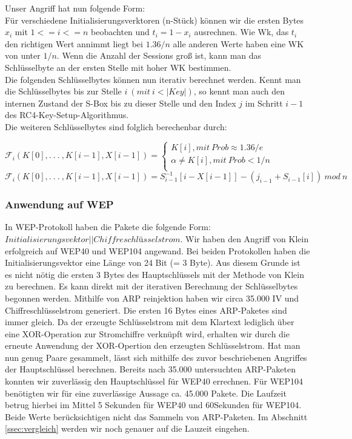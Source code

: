 \documentclass[10pt,a4paper]{article}
\begin{document}
Unser Angriff hat nun folgende Form:\\
Für verschiedene Initialisierungsverktoren (n-Stück) können wir die ersten Bytes $x_i$ mit $1 <= i <= n$ beobachten und $t_i = 1 - x_i$ ausrechnen. Wie Wk, das $t_i$ den richtigen Wert annimmt liegt bei $1.36/n$ alle anderen Werte haben eine WK von unter $1/n$. Wenn die Anzahl der Sessions groß ist, kann man das Schlüsselbyte an der ersten Stelle mit hoher WK bestimmen.\\
Die folgenden Schlüsselbytes können nun iterativ berechnet werden. Kennt man die Schlüsselbytes bis zur Stelle $i\ ( mit\  i < |Key|)$, so kennt man auch den internen Zustand der S-Box bis zu dieser Stelle und den Index $j$ im Schritt $i - 1$ des RC4-Key-Setup-Algorithmus. \\
Die weiteren Schlüsselbytes sind folglich berechenbar durch:
\begin{center}
$\mathcal{F}_i(K[0], .\ .\ .\ ,K[i-1],X[i-1]) = \begin{cases} K[i], mit \ Prob \approx 1.36/e \\ \alpha \neq K[i], mit \ Prob < 1/n \\\end{cases}$
\\\vspace{1em}
$\mathcal{F}_i(K[0], .\ .\ .\ ,K[i-1],X[i-1]) = S^{-1}_{i-1}[i-X[i-1]] - (j_{i-1}+S_{i-1}[i]) \ mod \ n$
\end{center}
 

\subsubsection{Anwendung auf WEP}
In WEP-Protokoll haben die Pakete die folgende Form: $Initialisierungsvektor || Chiffreschlüsselstrom $. Wir haben den Angriff von Klein erfolgreich auf WEP40 und WEP104 angewand. Bei beiden Protokollen haben die Initialisierungsvektor eine Länge von 24 Bit (= 3 Byte). Aus diesem Grunde ist es nicht nötig die ersten 3 Bytes des Hauptschlüssels mit der Methode von Klein zu berechnen. Es kann direkt mit der iterativen Berechnung der Schlüsselbytes begonnen werden. Mithilfe von ARP reinjektion haben wir circa 35.000 IV und Chiffreschlüsselstrom generiert. Die ersten 16 Bytes eines ARP-Paketes sind immer gleich. Da der erzeugte Schlüsselstrom mit dem Klartext lediglich über eine XOR-Operation zur Stromchiffre verknüpft wird, erhalten wir durch die erneute Anwendung der XOR-Opertion den erzeugten Schlüsselstrom. Hat man nun genug Paare gesammelt, lässt sich mithilfe des zuvor beschriebenen Angriffes der Hauptschlüssel berechnen. Bereits nach 35.000 untersuchten ARP-Paketen konnten wir zuverlässig den Hauptschlüssel für WEP40 errechnen. Für WEP104 benötigten wir für eine zuverlässige Aussage ca. 45.000 Pakete. Die Laufzeit betrug hierbei im Mittel 5 Sekunden für WEP40 und 60Sekunden für WEP104. Beide Werte berücksichtigen nicht das Sammeln von ARP-Paketen. Im Abschnitt \ref{ssec:vergleich} werden wir noch genauer auf die Lauzeit eingehen.
\end{document}
